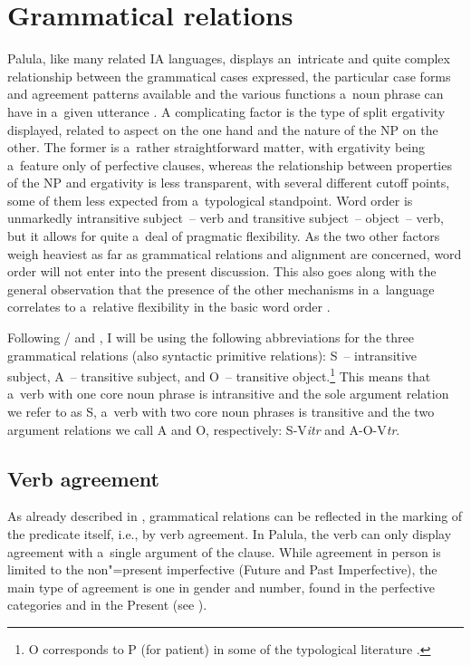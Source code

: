 \chapter{Grammatical relations}
\label{chap:11}

Palula, like many related IA languages, displays an~intricate and quite complex relationship between the grammatical cases expressed, the particular case forms and agreement patterns available and the various functions a~noun phrase can have in a~given utterance \citep[230--231]{masica1991}. A complicating factor is the type of split ergativity displayed, related to aspect on the one hand and the nature of the NP on the other. The former is a~rather straightforward matter, with ergativity being a~feature only of perfective clauses, whereas the relationship between properties of the NP and ergativity is less transparent, with several different cutoff points, some of them less expected from a~typological standpoint. Word order is unmarkedly intransitive subject~-- verb and transitive subject~-- object~-- verb, but it allows for quite a~deal of pragmatic flexibility. As the two other factors weigh heaviest as far as grammatical relations and alignment are concerned, word order will not enter into the present discussion. This also goes along with the general observation that the presence of the other mechanisms in a~language correlates to a~relative flexibility in the basic word order \citep[14--15]{blake2001}.



Following \citet[6--8]{dixon1994}/\citet[76--77]{dixon2010} and \citet[402]{bickel2011}, I will be using the following abbreviations for the three grammatical relations (also syntactic primitive relations): S~-- intransitive subject, A~-- transitive subject, and O~-- transitive object.\footnote{O corresponds to P (for patient) in some of the typological literature \citep{comrie1989,croft2003}.\par } This means that a~verb with one core noun phrase is intransitive and the sole argument relation we refer to as S, a~verb with two core noun phrases is transitive and the two argument relations we call A and O, respectively: S-V\textit{itr} and A-O-V\textit{tr}.


\section{Verb agreement}
\label{sec:11-1}

As already described in , grammatical relations can be reflected in the marking of the predicate itself, i.e., by verb agreement. In Palula, the verb can only display agreement with a~single argument of the clause. While agreement in person is limited to the non"=present imperfective (Future and Past Imperfective), the main type of agreement is one in gender and number, found in the perfective categories and in the Present (see ). 


